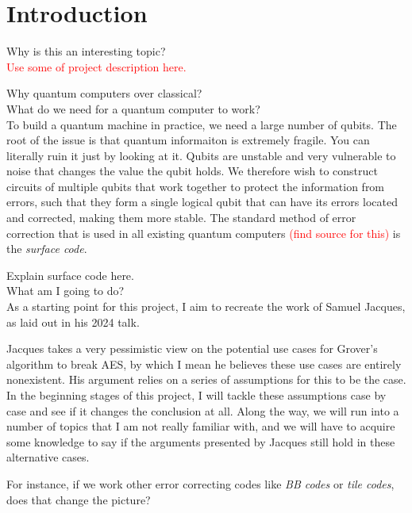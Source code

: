 \chapter{Introduction}
Why is this an interesting topic?\\
\textcolor{red}{Use some of project description here.}

Why quantum computers over classical?\\

What do we need for a quantum computer to work?\\
To build a quantum machine in practice, we need a large number of qubits. The root of the issue is that quantum informaiton is extremely fragile. You can literally ruin it just by looking at it. Qubits are unstable and very vulnerable to noise that changes the value the qubit holds. We therefore wish to construct circuits of multiple qubits that work together to protect the information from errors, such that they form a single logical qubit that can have its errors located and corrected, making them more stable. The standard method of error correction that is used in all existing quantum computers \textcolor{red}{(find source for this)} is the \emph{surface code}. 

Explain surface code here.\\


What am I going to do?\\
As a starting point for this project, I aim to recreate the work of Samuel Jacques, as laid out in his 2024 talk. 

Jacques takes a very pessimistic view on the potential use cases for Grover's algorithm to break AES, by which I mean he believes these use cases are entirely nonexistent. His argument relies on a series of assumptions for this to be the case. In the beginning stages of this project, I will tackle these assumptions case by case and see if it changes the conclusion at all. Along the way, we will run into a number of topics that I am not really familiar with, and we will have to acquire some knowledge to say if the arguments presented by Jacques still hold in these alternative cases.

For instance, if we work other error correcting codes like \emph{BB codes} or \emph{tile codes}, does that change the picture?


